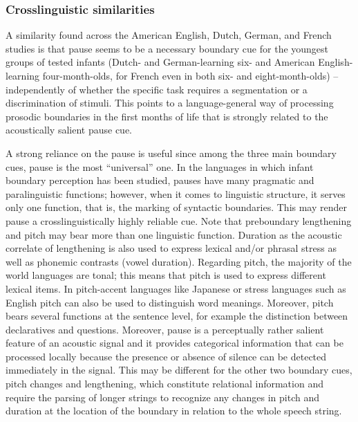 \documentclass[output=paper]{langscibook}
\begin{document}
\subsubsection{Crosslinguistic similarities}
A similarity found across the American English, Dutch, German, and French studies is that pause seems to be a necessary boundary cue for the youngest groups of tested infants (Dutch- and German-learning six- and American English-learning four-month-olds, for French even in both six- and eight-month-olds) -- independently of whether the specific task requires a segmentation or a discrimination of stimuli. This points to a language-general way of processing prosodic boundaries in the first months of life that is strongly related to the acoustically salient pause cue.

A strong reliance on the pause is useful since among the three main boundary cues, pause is the most “universal” one. In the languages in which infant boundary perception has been studied, pauses have many pragmatic and paralinguistic functions; however, when it comes to linguistic structure, it serves only one function, that is, the marking of syntactic boundaries. This may render pause a crosslinguistically highly reliable cue. Note that preboundary lengthening and pitch may bear more than one linguistic function. Duration as the acoustic correlate of lengthening is also used to express lexical and/or phrasal stress as well as phonemic contrasts (vowel duration). Regarding pitch, the majority of the world languages are tonal; this means that pitch is used to express different lexical items. In pitch-accent languages like Japanese or stress languages such as English pitch can also be used to distinguish word meanings. Moreover, pitch bears several functions at the sentence level, for example the distinction between declaratives and questions. Moreover, pause is a perceptually rather salient feature of an acoustic signal and it provides categorical information that can be processed locally because the presence or absence of silence can be detected immediately in the signal. This may be different for the other two boundary cues, pitch changes and lengthening, which constitute relational information and require the parsing of longer strings to recognize any changes in pitch and duration at the location of the boundary in relation to the whole speech string.
\end{document}
